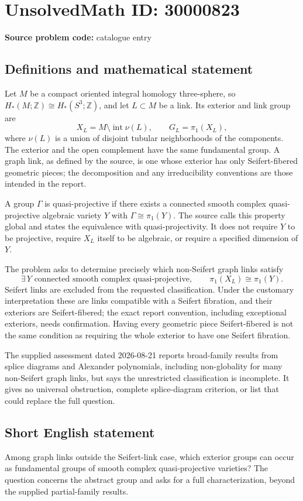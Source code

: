 \documentclass[11pt]{article}
\newcommand{\Z}{\mathbb{Z}}
\begin{document}
\section*{UnsolvedMath ID: 30000823}
\textbf{Source problem code:} catalogue entry
\subsection{Definitions and mathematical statement}
Let \(M\) be a compact oriented integral homology three-sphere, so \(H_*(M;\Z)\cong H_*(S^3;\Z)\), and let \(L\subset M\) be a link. Its exterior and link group are
\[
 X_L=M\setminus\operatorname{int}\nu(L),\qquad
 G_L=\pi_1(X_L),
\]
where \(\nu(L)\) is a union of disjoint tubular neighborhoods of the components. The exterior and the open complement have the same fundamental group. A graph link, as defined by the source, is one whose exterior has only Seifert-fibered geometric pieces; the decomposition and any irreducibility conventions are those intended in the report.

A group \(\Gamma\) is quasi-projective if there exists a connected smooth complex quasi-projective algebraic variety \(Y\) with \(\Gamma\cong\pi_1(Y)\). The source calls this property global and states the equivalence with quasi-projectivity. It does not require \(Y\) to be projective, require \(X_L\) itself to be algebraic, or require a specified dimension of \(Y\).

The problem asks to determine precisely which non-Seifert graph links satisfy
\[
 \exists\,Y\text{ connected smooth complex quasi-projective},\qquad
 \pi_1(X_L)\cong\pi_1(Y).
\]
Seifert links are excluded from the requested classification. Under the customary interpretation these are links compatible with a Seifert fibration, and their exteriors are Seifert-fibered; the exact report convention, including exceptional exteriors, needs confirmation. Having every geometric piece Seifert-fibered is not the same condition as requiring the whole exterior to have one Seifert fibration.

The supplied assessment dated 2026-08-21 reports broad-family results from splice diagrams and Alexander polynomials, including non-globality for many non-Seifert graph links, but says the unrestricted classification is incomplete. It gives no universal obstruction, complete splice-diagram criterion, or list that could replace the full question.
\subsection{Short English statement}
Among graph links outside the Seifert-link case, which exterior groups can occur as fundamental groups of smooth complex quasi-projective varieties? The question concerns the abstract group and asks for a full characterization, beyond the supplied partial-family results.
\end{document}
